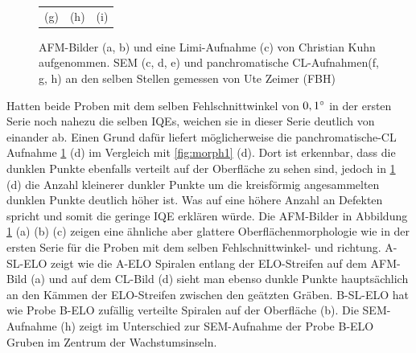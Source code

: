 \begin{figure}[H]
\begin{tabular}{ccc}
(g)  & (h) & (i)   \\[6pt]
\end{tabular}
\caption{AFM-Bilder (a, b) und eine Limi-Aufnahme (c) von Christian Kuhn aufgenommen. SEM (c, d, e) und panchromatische CL-Aufnahmen(f, g, h) an den selben Stellen gemessen von Ute Zeimer (FBH)}
\label{fig:morph2}
\end{figure}
\noindent 
Hatten beide Proben mit dem selben Fehlschnittwinkel von $0,1 \degree$ in der ersten Serie noch nahezu die selben IQEs, weichen sie in dieser Serie deutlich von einander ab. Einen Grund dafür liefert möglicherweise die panchromatische-CL Aufnahme \ref{fig:morph2} (d) im Vergleich mit \ref{fig:morph1} (d). Dort ist erkennbar, dass die dunklen Punkte ebenfalls verteilt auf der Oberfläche zu sehen sind, jedoch in \ref{fig:morph2} (d) die Anzahl kleinerer dunkler Punkte um die kreisförmig angesammelten dunklen Punkte deutlich höher ist. Was auf eine höhere Anzahl an Defekten spricht und somit die geringe IQE erklären würde. Die AFM-Bilder in Abbildung \ref{fig:morph2} (a) (b) (c) zeigen eine ähnliche aber glattere Oberflächenmorphologie wie in der ersten Serie für die Proben mit dem selben Fehlschnittwinkel- und richtung. A-SL-ELO zeigt wie die A-ELO Spiralen entlang der ELO-Streifen auf dem AFM-Bild (a) und auf dem CL-Bild (d) sieht man ebenso dunkle Punkte hauptsächlich an den Kämmen der ELO-Streifen zwischen den geätzten Gräben. B-SL-ELO hat wie Probe B-ELO zufällig verteilte Spiralen auf der Oberfläche (b). Die SEM-Aufnahme (h) zeigt im Unterschied zur SEM-Aufnahme der Probe B-ELO Gruben im Zentrum der Wachstumsinseln. 
